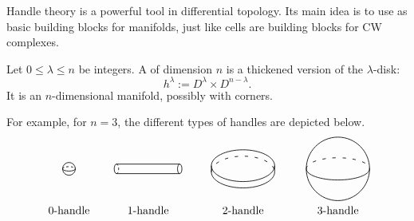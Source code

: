 Handle theory is a powerful tool in differential topology.
Its main idea is to use 
as basic building blocks for manifolds,
just like cells are building blocks for CW complexes.

\begin{definition}
    Let $0\leq\lambda\leq n$ be integers.
    A  of dimension $n$ 
    is a thickened version of the $\lambda$-disk:
    \[ h^\lambda := D^\lambda \times D^{n-\lambda}. \]
    It is an $n$-dimensional manifold, possibly with corners. \varqed
\end{definition}

For example, for $n=3$, the different types of handles are depicted below.
\[ \begin{tikzpicture}[line width=.6, baseline=(base.base)]
    \tikzstyle{dp}=[dash pattern=on 2pt off 2pt]
    \draw (0,0) circle (.2);
    \draw[dp] (-.2,0) arc (180 : 0 : .2 and .07);
    \draw (-.2,0) arc (180 : 360 : .2 and .07);
    \node at (0,-1.3) {\text{$0$-handle}};
    
    \draw (1.5,.15) arc (90 : 270 : .07 and .15);
    \draw[dp] (1.5,.15) arc (90 : -90 : .07 and .15);
    \draw (3.5,0) ellipse (.07 and .15);
    \draw (1.5,.15) -- (3.5,.15) (1.5,-.15) -- (3.5,-.15);
    \node at (2.5,-1.3) {\text{$1$-handle}};

    \draw (5.5,.1) ellipse (1 and .5);
    \draw[loosely dashed] (4.5,-.1) arc (180 : 0 : 1 and .5);
    \draw (4.5,-.1) arc (180 : 360 : 1 and .5);
    \draw (4.5,.1) -- (4.5,-.1) (6.5,.1) -- (6.5,-.1);
    \node at (5.5,-1.3) {\text{$2$-handle}};

    \draw (8.5,0) circle (1);
    \draw[loosely dashed] (7.5,0) arc (180 : 0 : 1 and .35);
    \draw (7.5,0) arc (180 : 360 : 1 and .35);
    \node (base) at (8.5,-1.3) {\text{$3$-handle}};
\end{tikzpicture} \]

